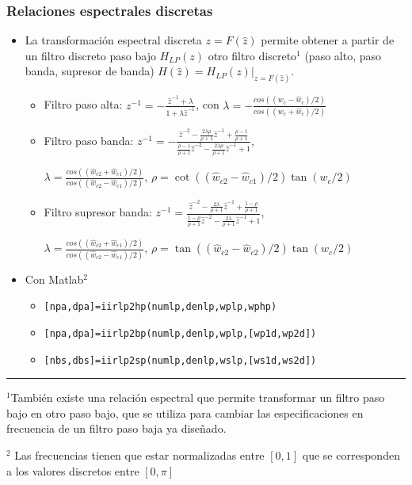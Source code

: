 \documentclass[handout]{beamer}
\numberwithin{section}{part}
\begin{document}
\begin{frame}
\frametitle{Relaciones espectrales discretas}

\begin{itemize}
\footnotesize
\item La transformación espectral discreta $z=F(\hat z)$ permite obtener a partir de un filtro discreto paso bajo $H_{LP}(z)$  otro filtro discreto$^1$ (paso alto, paso banda, supresor de banda) $H(\hat z)=H_{LP}(z)|_{z=F(\hat z)}$.
\begin{itemize}
\footnotesize

\item Filtro paso alta: $z^{-1}=-\frac{\hat z^{-1}+\lambda}{1+\lambda \hat z^{-1}}$, con
$\lambda=-\frac{cos((w_c-	\hat w_c)/2)}{cos((w_c+	\hat w_c)/2)}$



\item Filtro paso banda: $z^{-1}=-\frac{\hat z^{-2}-\frac{2\lambda \rho}{\rho+1}\hat z^{-1}+\frac{\rho-1}{\rho+1}}{\frac{\rho-1}{\rho+1}\hat z^{-2}-\frac{2\lambda \rho}{\rho+1}\hat z^{-1}+1}$,

$\lambda=\frac{cos((\hat w_{c2}+	\hat w_{c1})/2)}{cos((\hat w_{c2}-	\hat w_{c1})/2)}$, $\rho=\cot((\hat w_{c2}-\hat w_{c1})/2)\tan(w_c/2)$

\item Filtro supresor banda: $z^{-1}=\frac{\hat z^{-2}-\frac{2\lambda}{\rho+1}\hat z^{-1}+\frac{1-\rho}{\rho+1}}{\frac{1-\rho}{\rho+1}\hat z^{-2}-\frac{2\lambda}{\rho+1}\hat z^{-1}+1}$,

$\lambda=\frac{cos((\hat w_{c2}+\hat w_{c1})/2)}{cos((\hat w_{c2}-\hat w_{c1})/2)}$, $\rho=\tan((\hat w_{c2}-\hat w_{c2})/2)\tan(w_c/2)$


\end{itemize}

\item Con Matlab$^{2}$
\begin{itemize}
\footnotesize
\item \texttt{[npa,dpa]=iirlp2hp(numlp,denlp,wplp,wphp)}
\item \texttt{[npa,dpa]=iirlp2bp(numlp,denlp,wplp,[wp1d,wp2d])}
\item \texttt{[nbs,dbs]=iirlp2sp(numlp,denlp,wslp,[ws1d,ws2d])}
\end{itemize}
\end{itemize}

\vspace{-0.2cm}
\rule{10cm}{0.4pt}

\scriptsize
$^1$También existe una relación espectral que permite transformar un filtro paso bajo en otro paso bajo, que se utiliza para cambiar las especificaciones en frecuencia de un filtro paso baja ya diseñado.

$^2$ Las frecuencias tienen que estar  normalizadas entre $[0,1]$ que se corresponden a los valores discretos entre $[0,\pi]$


\end{frame}
\end{document}
